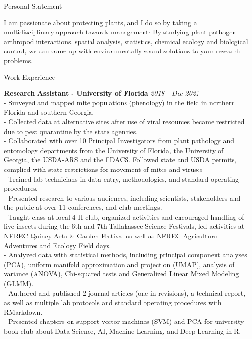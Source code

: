 \documentclass{resume} %
\begin{document}
\begin{rSection}{Personal Statement}
	
I am passionate about protecting plants, and I do so by taking a multidisciplinary approach towards management: By studying plant-pathogen-arthropod interactions, spatial analysis, statistics, chemical ecology and biological control, we can come up with environmentally sound solutions to your research problems. \end{rSection}

\begin{rSection}{Work Experience}
	
	\textbf{Research Assistant - University of Florida} \hfill {\em \textit{2018 - Dec 2021}}\\
- Surveyed and mapped mite populations (phenology) in the field in northern Florida and southern Georgia.\\
- Collected data at alternative sites after use of viral resources became restricted due to pest quarantine by the state agencies.\\
- Collaborated with over 10 Principal Investigators from plant pathology and entomology departments from the University of Florida, the University of Georgia, the USDA-ARS and the FDACS. Followed state and USDA permits, complied with state restrictions for movement of mites and viruses\\
 - Trained lab technicians in data entry, methodologies, and standard operating procedures.\\
 - Presented research to various audiences, including scientists, stakeholders and the public at over 11 conferences, and club meetings.\\
 - Taught class at local 4-H club, organized activities and encouraged handling of live insects during the 6th and 7th Tallahassee Science Festivals, led activities at NFREC-Quincy Arts \& Garden Festival as well as NFREC Agriculture Adventures and Ecology Field days.\\
 -  Analyzed data with statistical methods, including principal component analyses (PCA), uniform manifold approximation and projection (UMAP), analysis of variance (ANOVA), Chi-squared tests and Generalized Linear Mixed Modeling (GLMM). \\
 - Authored and published 2 journal articles (one in revisions), a technical report, as well as multiple lab protocols and standard operating procedures with RMarkdown.\\
 - Presented chapters on support vector machines (SVM) and PCA for university book club about Data Science, AI, Machine Learning, and Deep Learning in R.


\end{rSection}
\end{document}
